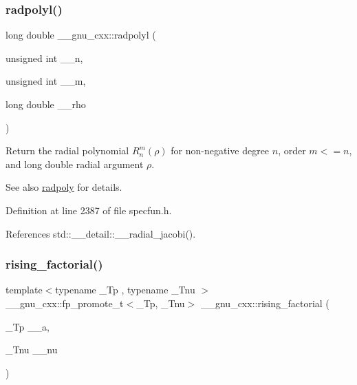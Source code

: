 \subsubsection{\texorpdfstring{radpolyl()}{radpolyl()}}
{\footnotesize\ttfamily long double \+\_\+\+\_\+gnu\+\_\+cxx\+::radpolyl (\begin{DoxyParamCaption}\item[{unsigned int}]{\+\_\+\+\_\+n,  }\item[{unsigned int}]{\+\_\+\+\_\+m,  }\item[{long double}]{\+\_\+\+\_\+rho }\end{DoxyParamCaption})\hspace{0.3cm}{\ttfamily [inline]}}

Return the radial polynomial $ R_n^m(\rho) $ for non-\/negative degree $ n $, order $ m <= n $, and {\ttfamily long double} radial argument $ \rho $.

\begin{DoxySeeAlso}{See also}
\hyperlink{group__gnu__math__spec__func_ga195db2592888b7a8df870d9eaeff8d05}{radpoly} for details. 
\end{DoxySeeAlso}


Definition at line 2387 of file specfun.\+h.



References std\+::\+\_\+\+\_\+detail\+::\+\_\+\+\_\+radial\+\_\+jacobi().

\mbox{\label{group__gnu__math__spec__func_gae8c36a0e1f60254cf212a3806f7c675c}} 
\subsubsection{\texorpdfstring{rising\+\_\+factorial()}{rising\_factorial()}}
{\footnotesize\ttfamily template$<$typename \+\_\+\+Tp , typename \+\_\+\+Tnu $>$ \\
\+\_\+\+\_\+gnu\+\_\+cxx\+::fp\+\_\+promote\+\_\+t$<$\+\_\+\+Tp, \+\_\+\+Tnu$>$ \+\_\+\+\_\+gnu\+\_\+cxx\+::rising\+\_\+factorial (\begin{DoxyParamCaption}\item[{\+\_\+\+Tp}]{\+\_\+\+\_\+a,  }\item[{\+\_\+\+Tnu}]{\+\_\+\+\_\+nu }\end{DoxyParamCaption})\hspace{0.3cm}{\ttfamily [inline]}}



